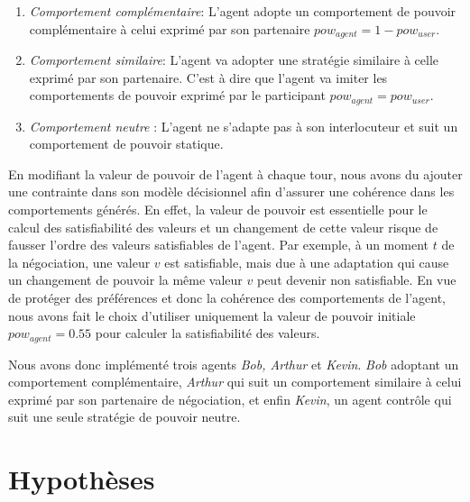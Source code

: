 	
	
	\begin{enumerate}
		\item \textit{Comportement complémentaire}: L'agent adopte un comportement de pouvoir complémentaire à celui exprimé par son partenaire $pow_{agent}=1-pow_{user}$.
		
		\item \textit{Comportement similaire}: L'agent va adopter une stratégie similaire à celle exprimé par son partenaire. C'est à dire que l'agent va imiter les comportements de pouvoir exprimé par le participant $pow_{agent} = pow_{user}$.
		
		\item \textit{Comportement neutre} : L'agent ne s'adapte pas à son interlocuteur et suit un comportement de pouvoir statique.
	\end{enumerate}
	
	En modifiant la valeur de pouvoir de l'agent à chaque tour, nous avons du ajouter une contrainte dans son modèle décisionnel afin d'assurer une cohérence dans les comportements générés. 
	En effet, la valeur de pouvoir est essentielle pour le calcul des satisfiabilité des valeurs et un changement de cette valeur risque de fausser l'ordre des valeurs satisfiables de l'agent.
	Par exemple, à un moment $t$ de la négociation, une valeur $v$ est satisfiable, mais due à une adaptation qui cause un changement de pouvoir la même valeur $v$ peut devenir non satisfiable.
	En vue de protéger des préférences et donc la cohérence des comportements de l'agent, nous avons fait le choix d'utiliser uniquement la valeur de pouvoir initiale $pow_{agent} = 0.55$ pour calculer la satisfiabilité des valeurs.
	
	Nous avons donc implémenté trois agents \emph{Bob, Arthur} et \emph{Kevin}. \emph{Bob} adoptant un comportement complémentaire, \emph{Arthur} qui suit un comportement similaire à celui exprimé par son partenaire de négociation, et enfin \emph{Kevin}, un agent contrôle qui suit une seule stratégie de pouvoir neutre. 
	
\section{Hypothèses}
\label{sec:H}


